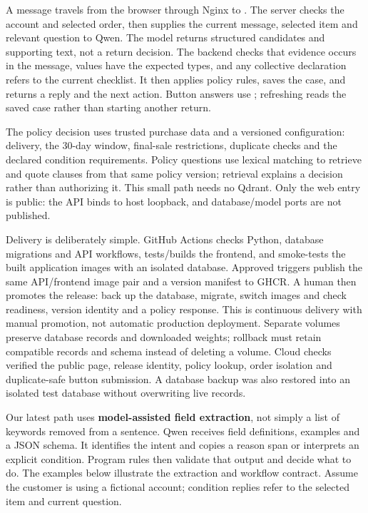 \documentclass[10pt,letterpaper]{article}
\newcommand{\heading}[1]{\vspace{3pt}{\large\bfseries #1}\par\vspace{2pt}}
\newcommand{\code}[1]{\texttt{\small\detokenize{#1}}}
\begin{document}
A message travels from the browser through Nginx to \code{POST /api/v1/chat}.
The server checks the account and selected order, then supplies the current message,
selected item and relevant question to Qwen. The model returns structured candidates
and supporting text, not a return decision. The backend checks that evidence occurs
in the message, values have the expected types, and any collective declaration refers
to the current checklist. It then applies policy rules, saves the case, and returns a
reply and the next action. Button answers use
\code{POST /api/v1/questions/{id}/answer}; refreshing reads the saved case rather than
starting another return.

The policy decision uses trusted purchase data and a versioned configuration:
delivery, the 30-day window, final-sale restrictions, duplicate checks and the declared
condition requirements. Policy questions use lexical matching to retrieve and quote
clauses from that same policy version; retrieval explains a decision rather than
authorizing it. This small path needs no Qdrant. Only the web entry is public: the API
binds to host loopback, and database/model ports are not published.

Delivery is deliberately simple. GitHub Actions checks Python, database migrations
and API workflows, tests/builds the frontend, and smoke-tests the built application
images with an isolated database. Approved triggers publish the same API/frontend
image pair and a version manifest to GHCR. A human then promotes the release:
back up the database, migrate, switch images and check readiness, version identity
and a policy response. This is continuous delivery with manual promotion, not
automatic production deployment. Separate volumes preserve database records and
downloaded weights; rollback must retain compatible records and schema instead of
deleting a volume. Cloud checks verified the public page, release identity, policy
lookup, order isolation and duplicate-safe button submission. A database backup was
also restored into an isolated test database without overwriting live records.

\newpage
\heading{3. Prototype: what the sentence means, and who extracts it}
Our latest path uses \textbf{model-assisted field extraction}, not simply a list of
keywords removed from a sentence. Qwen receives field definitions, examples and a
JSON schema. It identifies the intent and copies a reason span or interprets an
explicit condition. Program rules then validate that output and decide what to do.
The examples below illustrate the extraction and workflow contract.
Assume the customer is using a fictional account; condition replies refer to the
selected item and current question.
\end{document}
